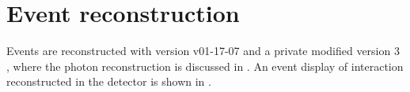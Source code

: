 \section{Event reconstruction}
\label{sec:tauReco}

Events are reconstructed with  \ilcsoft version v01-17-07 \cite{Gaede:82475} and a private modified \pandora version 3 \cite{Marshall:2015rfa}, where the photon reconstruction is discussed in . An event display of \eeToTauTau interaction reconstructed in the \ILD detector is shown in .



